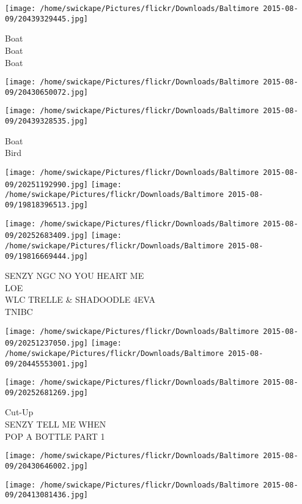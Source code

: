 \documentclass[10pt,letterpaper]{article}
\begin{document}
\vspace{0.25in}
\texttt{[image: /home/swickape/Pictures/flickr/Downloads/Baltimore 2015-08-09/20439329445.jpg]}

Boat\\
Boat\\
Boat\\
\pagebreak

\texttt{[image: /home/swickape/Pictures/flickr/Downloads/Baltimore 2015-08-09/20430650072.jpg]}

\vspace{0.25in}
\texttt{[image: /home/swickape/Pictures/flickr/Downloads/Baltimore 2015-08-09/20439328535.jpg]}

Boat\\
Bird\\
\pagebreak

\texttt{[image: /home/swickape/Pictures/flickr/Downloads/Baltimore 2015-08-09/20251192990.jpg]}
\texttt{[image: /home/swickape/Pictures/flickr/Downloads/Baltimore 2015-08-09/19818396513.jpg]}

\texttt{[image: /home/swickape/Pictures/flickr/Downloads/Baltimore 2015-08-09/20252683409.jpg]}
\texttt{[image: /home/swickape/Pictures/flickr/Downloads/Baltimore 2015-08-09/19816669444.jpg]}

SENZY NGC NO YOU HEART ME\\
LOE\\
WLC TRELLE \& SHADOODLE 4EVA\\
TNIBC\\
\pagebreak

\texttt{[image: /home/swickape/Pictures/flickr/Downloads/Baltimore 2015-08-09/20251237050.jpg]}
\texttt{[image: /home/swickape/Pictures/flickr/Downloads/Baltimore 2015-08-09/20445553001.jpg]}

\texttt{[image: /home/swickape/Pictures/flickr/Downloads/Baltimore 2015-08-09/20252681269.jpg]}

Cut{-}Up\\
SENZY TELL ME WHEN\\
POP A BOTTLE PART 1\\
\pagebreak

\texttt{[image: /home/swickape/Pictures/flickr/Downloads/Baltimore 2015-08-09/20430646002.jpg]}

\vspace{0.25in}
\texttt{[image: /home/swickape/Pictures/flickr/Downloads/Baltimore 2015-08-09/20413081436.jpg]}
\end{document}
